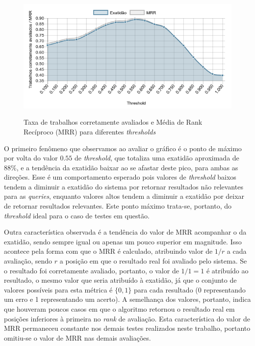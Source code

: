 \documentclass[12pt]{article}
\begin{document}
 \begin{figure}[!h]
    \centering
    \caption{Taxa de trabalhos corretamente avaliados e Média de Rank Recíproco (MRR) para diferentes \textit{thresholds}}
    \includegraphics[width=\textwidth]{../figuras/avaliacao-threshold.png}
    \label{fig:avaliacao-threshold}
 \end{figure}

O primeiro fenômeno que observamos ao avaliar o gráfico é o ponto de máximo por volta do valor $0.55$ de \textit{threshold}, que totaliza uma exatidão aproximada de 88\%, e a tendência da exatidão baixar ao se afastar deste pico, para ambas as direções. Esse é um comportamento esperado pois valores de \textit{threshold} baixos tendem a diminuir a exatidão do sistema por retornar resultados não relevantes para as \textit{queries}, enquanto valores altos tendem a diminuir a exatidão por deixar de retornar resultados relevantes. Este ponto máximo trata-se, portanto, do \textit{threshold} ideal para o caso de testes em questão.

Outra característica observada é a tendência do valor de MRR acompanhar o da exatidão, sendo sempre igual ou apenas um pouco superior em magnitude. Isso acontece pela forma com que o MRR é calculado, atribuindo valor de $1/r$ a cada avaliação, sendo $r$ a posição em que o resultado real foi avaliado pelo sistema. Se o resultado foi corretamente avaliado, portanto, o valor de $1/1 = 1$ é atribuído ao resultado, o mesmo valor que seria atribuído à exatidão, já que o conjunto de valores possíveis para esta métrica é $\{0, 1\}$ para cada resultado (0 representando um erro e 1 representando um acerto). A semelhança dos valores, portanto, indica que houveram poucos casos em que o algoritmo retornou o resultado real em posições inferiores à primeira no \textit{rank} de avaliação. Esta característica do valor de MRR permaneceu constante nos demais testes realizados neste trabalho, portanto omitiu-se o valor de MRR nas demais avaliações.
\end{document}

